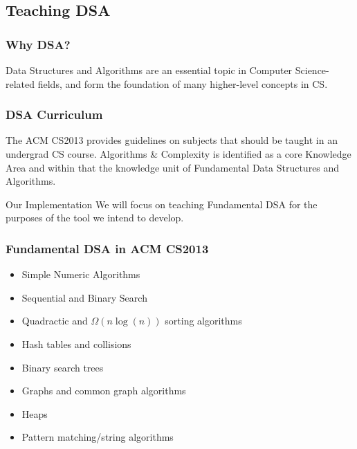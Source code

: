 \documentclass{beamer}
\begin{document}
\subsection{Teaching DSA}
\begin{frame}
  \frametitle{Why DSA?}
  Data Structures and Algorithms are an essential topic in Computer Science-related fields, and form the foundation of many higher-level concepts in CS.
\end{frame}
\begin{frame}
  \frametitle{DSA Curriculum}
  The ACM CS2013 provides guidelines on subjects that should be taught in an undergrad CS course. Algorithms \& Complexity is identified as a core Knowledge Area and within that the knowledge unit of Fundamental Data Structures and Algorithms.
  \pause
  \begin{block}{Our Implementation}
  We will focus on teaching Fundamental DSA for the purposes of the tool we intend to develop.
  \end{block}
\end{frame}
\begin{frame}
  \frametitle{Fundamental DSA in ACM CS2013}
  \begin{itemize}
    \item Simple Numeric Algorithms
    \item Sequential and Binary Search
    \item Quadractic and $\Omega(n\log(n))$ sorting algorithms
    \item Hash tables and collisions
    \item Binary search trees
    \item Graphs and common graph algorithms
    \item Heaps
    \item Pattern matching/string algorithms
  \end{itemize}
\end{frame}
\end{document}
